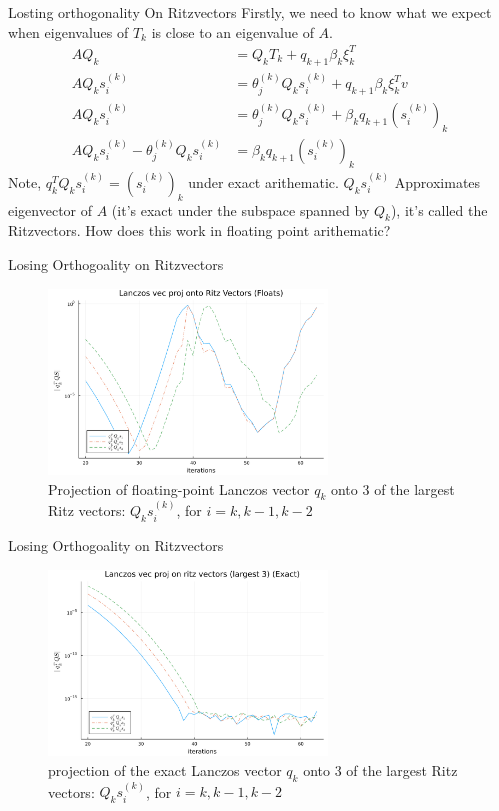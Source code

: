 \documentclass{beamer}
\begin{document}
    \begin{frame}{Losting orthogonality On Ritzvectors}
        Firstly, we need to know what we expect when eigenvalues of $T_k$ is close to an eigenvalue of $A$. 
        \begin{align}
            AQ_k &= Q_k T_k + q_{k + 1}\beta_k\xi_k^T
            \\
            AQ_ks_i^{(k)} &= \theta_j^{(k)} Q_k s_i^{(k)} + q_{k + 1}\beta_k \xi_k^Tv
            \\
            AQ_ks_i^{(k)} &= \theta_j^{(k)} Q_k s_i^{(k)} + \beta_kq_{k + 1}(s_i^{(k)})_k
            \\
            AQ_ks_i^{(k)} - \theta_j^{(k)} Q_k s_i^{(k)} &=   \beta_kq_{k + 1}(s_i^{(k)})_k
        \end{align}
        Note, $q_k^TQ_ks_i^{(k)} = (s_i^{(k)})_k$ under exact arithematic. $Q_ks_i^{(k)}$ Approximates eigenvector of $A$ (it's exact under the subspace spanned by $Q_k$), it's called the Ritzvectors. How does this work in floating point arithematic? 
    \end{frame}
    \begin{frame}{Losing Orthogoality on Ritzvectors}
        \begin{figure}[H]
            \centering
            \includegraphics[width=20em]{lanczos_proj_on_ritz_float.png}
            \caption{Projection of floating-point Lanczos vector $q_k$ onto 3 of the largest Ritz vectors: $Q_ks_i^{(k)}$, for $i = k, k - 1, k - 2$
            }
        \end{figure}
    \end{frame}
    \begin{frame}{Losing Orthogoality on Ritzvectors}
        \begin{figure}[H]
            \centering
            \includegraphics[width=20em]{lanczos_proj_on_ritz_exact.png}
            \caption{projection of the exact Lanczos vector $q_k$ onto 3 of the largest Ritz vectors: $Q_ks_i^{(k)}$, for $i = k, k - 1, k - 2$}
        \end{figure}
    \end{frame}
\end{document}
